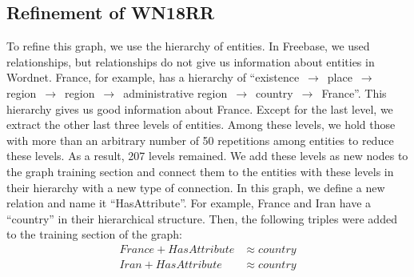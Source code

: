 \documentclass{article} \usepackage{iclr2022_conference,times}
\begin{document}
\subsection{Refinement of WN18RR}
To refine this graph, we use the hierarchy of entities. In Freebase, we used relationships, but relationships do not give us information about entities in Wordnet. France, for example, has a hierarchy of ``existence $\,\to\,$ place $\,\to\,$ region $\,\to\,$ region $\,\to\,$ administrative region $\,\to\,$ country $\,\to\,$ France''. This hierarchy gives us good information about France. Except for the last level, we extract the other last three levels of entities.  Among these levels, we hold those with more than an arbitrary number of 50 repetitions among entities to reduce these levels. As a result, 207 levels remained. We add these levels as new nodes to the graph training section and connect them to the entities with these levels in their hierarchy with a new type of connection. In this graph, we define a new relation and name it ``HasAttribute''. For example, France and Iran have a ``country'' in their hierarchical structure. Then, the following triples were added to the training section of the graph:
\begin{align*}
	France + HasAttribute &\approx country \\
	Iran + HasAttribute &\approx country 	
\end{align*}
\end{document}

